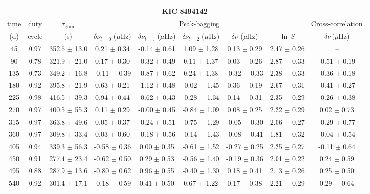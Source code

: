 \documentclass[twocolumn]{aastex61}%
\begin{document}
\begin{table*}[ht]\centering\fontsize{9.}{7.}\selectfont
\begin{tabular}{ccc|ccccc|c}
\multicolumn{9}{c}{KIC 8494142}\\ \hline\hline
time & duty & $\tau_\text{gran}$ &\multicolumn{5}{c|}{Peak-bagging}&Cross-correlation\\
(d)& cycle & (s)&$\delta\nu_{l=0}$ ($\mu$Hz) & $\delta\nu_{l=1}$ ($\mu$Hz) & $\delta\nu_{l=2}$ ($\mu$Hz) & $\delta\nu$ ($\mu$Hz)& $\ln\,S$ & $\delta\nu\,(\mu$Hz)\\\hline
45 & 0.97 & 352.6 $\pm$ 13.0 & 0.21 $\pm$ 0.34 & -0.14 $\pm$ 0.61 & 1.09 $\pm$ 1.28 & 0.13 $\pm$ 0.29 & 2.47 $\pm$ 0.26 & --\\
90 & 0.78 & 321.9 $\pm$ 21.0 & 0.17 $\pm$ 0.30 & -0.32 $\pm$ 0.49 & 0.11 $\pm$ 1.37 & 0.03 $\pm$ 0.26 & 2.87 $\pm$ 0.33 & -0.51 $\pm$ 0.19\\
135 & 0.73 & 349.2 $\pm$ 16.8 & -0.11 $\pm$ 0.39 & -0.87 $\pm$ 0.62 & 0.24 $\pm$ 1.38 & -0.32 $\pm$ 0.33 & 2.38 $\pm$ 0.33 & -0.36 $\pm$ 0.18\\
180 & 0.92 & 395.8 $\pm$ 21.9 & 0.63 $\pm$ 0.21 & -1.12 $\pm$ 0.48 & -0.02 $\pm$ 1.45 & 0.36 $\pm$ 0.19 & 2.67 $\pm$ 0.31 & -0.41 $\pm$ 0.27\\
225 & 0.98 & 416.5 $\pm$ 39.3 & 0.94 $\pm$ 0.44 & -0.62 $\pm$ 0.43 & -0.28 $\pm$ 1.34 & 0.14 $\pm$ 0.31 & 2.35 $\pm$ 0.29 & -0.26 $\pm$ 0.38\\
270 & 0.97 & 400.5 $\pm$ 55.3 & 0.11 $\pm$ 0.29 & -0.00 $\pm$ 0.45 & -0.84 $\pm$ 1.09 & 0.08 $\pm$ 0.25 & 2.22 $\pm$ 0.29 & 0.02 $\pm$ 0.73\\
315 & 0.97 & 363.8 $\pm$ 49.6 & 0.05 $\pm$ 0.37 & -0.24 $\pm$ 0.51 & -0.75 $\pm$ 1.29 & -0.05 $\pm$ 0.30 & 2.06 $\pm$ 0.27 & -0.29 $\pm$ 0.77\\
360 & 0.97 & 309.8 $\pm$ 33.4 & 0.03 $\pm$ 0.60 & -0.18 $\pm$ 0.56 & -0.14 $\pm$ 1.43 & -0.08 $\pm$ 0.41 & 1.81 $\pm$ 0.32 & -0.04 $\pm$ 0.54\\
405 & 0.94 & 339.3 $\pm$ 56.3 & -0.58 $\pm$ 0.36 & 0.00 $\pm$ 0.35 & -0.61 $\pm$ 1.52 & -0.27 $\pm$ 0.25 & 2.25 $\pm$ 0.27 & -0.11 $\pm$ 0.64\\
450 & 0.91 & 277.4 $\pm$ 23.4 & -0.62 $\pm$ 0.50 & 0.29 $\pm$ 0.53 & -0.56 $\pm$ 1.40 & -0.19 $\pm$ 0.36 & 2.01 $\pm$ 0.22 & 0.24 $\pm$ 0.59\\
495 & 0.88 & 287.9 $\pm$ 13.6 & -0.80 $\pm$ 0.62 & 0.96 $\pm$ 0.55 & -0.40 $\pm$ 1.30 & 0.18 $\pm$ 0.41 & 2.13 $\pm$ 0.26 & 0.25 $\pm$ 0.50\\
540 & 0.92 & 301.4 $\pm$ 17.1 & -0.18 $\pm$ 0.59 & 0.41 $\pm$ 0.50 & 0.67 $\pm$ 1.22 & 0.17 $\pm$ 0.38 & 2.21 $\pm$ 0.29 & 0.29 $\pm$ 0.64\\

\end{tabular}
\end{table*}
\end{document}
